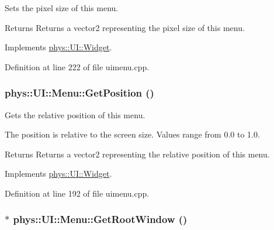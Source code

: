 Sets the pixel size of this menu. 

\begin{DoxyReturn}{Returns}
Returns a vector2 representing the pixel size of this menu. 
\end{DoxyReturn}


Implements \hyperlink{classphys_1_1UI_1_1Widget_af3a685621ed220748c0940ea38c96ed2}{phys::UI::Widget}.



Definition at line 222 of file uimenu.cpp.

\hypertarget{classphys_1_1UI_1_1Menu_a3c19fe2596fe4049325cc580daa70387}{
\subsubsection[{GetPosition}]{ phys::UI::Menu::GetPosition ()}}
\label{d6/dd3/classphys_1_1UI_1_1Menu_a3c19fe2596fe4049325cc580daa70387}


Gets the relative position of this menu. 

The position is relative to the screen size. Values range from 0.0 to 1.0. \begin{DoxyReturn}{Returns}
Returns a vector2 representing the relative position of this menu. 
\end{DoxyReturn}


Implements \hyperlink{classphys_1_1UI_1_1Widget_a3e464b028b0d1b5755923b8790260c33}{phys::UI::Widget}.



Definition at line 192 of file uimenu.cpp.

\hypertarget{classphys_1_1UI_1_1Menu_a9926f44b122c804b68034a759ea4a967}{
\subsubsection[{GetRootWindow}]{ $\ast$ phys::UI::Menu::GetRootWindow ()}}
\label{d6/dd3/classphys_1_1UI_1_1Menu_a9926f44b122c804b68034a759ea4a967}


